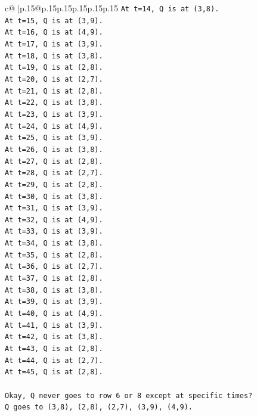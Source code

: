 \documentclass{article}
\begin{document}
{\begin{supertabular}{c@{$\;$}|p{.15\linewidth}@{}p{.15\linewidth}p{.15\linewidth}p{.15\linewidth}p{.15\linewidth}p{.15\linewidth}}
{{{\texttt{At t=14, Q is at (3,8).} \\
\texttt{At t=15, Q is at (3,9).} \\
\texttt{At t=16, Q is at (4,9).} \\
\texttt{At t=17, Q is at (3,9).} \\
\texttt{At t=18, Q is at (3,8).} \\
\texttt{At t=19, Q is at (2,8).} \\
\texttt{At t=20, Q is at (2,7).} \\
\texttt{At t=21, Q is at (2,8).} \\
\texttt{At t=22, Q is at (3,8).} \\
\texttt{At t=23, Q is at (3,9).} \\
\texttt{At t=24, Q is at (4,9).} \\
\texttt{At t=25, Q is at (3,9).} \\
\texttt{At t=26, Q is at (3,8).} \\
\texttt{At t=27, Q is at (2,8).} \\
\texttt{At t=28, Q is at (2,7).} \\
\texttt{At t=29, Q is at (2,8).} \\
\texttt{At t=30, Q is at (3,8).} \\
\texttt{At t=31, Q is at (3,9).} \\
\texttt{At t=32, Q is at (4,9).} \\
\texttt{At t=33, Q is at (3,9).} \\
\texttt{At t=34, Q is at (3,8).} \\
\texttt{At t=35, Q is at (2,8).} \\
\texttt{At t=36, Q is at (2,7).} \\
\texttt{At t=37, Q is at (2,8).} \\
\texttt{At t=38, Q is at (3,8).} \\
\texttt{At t=39, Q is at (3,9).} \\
\texttt{At t=40, Q is at (4,9).} \\
\texttt{At t=41, Q is at (3,9).} \\
\texttt{At t=42, Q is at (3,8).} \\
\texttt{At t=43, Q is at (2,8).} \\
\texttt{At t=44, Q is at (2,7).} \\
\texttt{At t=45, Q is at (2,8).} \\
\\ 
\texttt{Okay, Q never goes to row 6 or 8 except at specific times?} \\
\texttt{Q goes to (3,8), (2,8), (2,7), (3,9), (4,9).} \\
}}}
\end{supertabular}}
\end{document}
